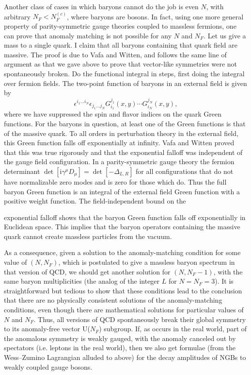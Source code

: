 Another class of cases in which baryons cannot do the job is even $N$, with
arbitrary $N_F<N_F^{(c)}$, where baryons are bosons. In fact, using one more
general property of parity-symmetric gauge theories coupled to massless
fermions, one can prove that anomaly matching is not possible for any $N$ and
$N_F$. Let us give a mass to a single quark. I claim that all baryons
containing that quark field are massive. The proof is due to Vafa and Witten,
and follows the same line of argument as that we gave above to prove that
vector-like symmetries were not spontaneously broken. Do the functional
integral in steps, first doing the integral over fermion fields. The two-point
function of baryons in an external field is given by
\[
  \epsilon^{i_1\ldots i_N}\epsilon_{j_1\ldots j_N}
  G^{j_1}_{i_1}(x,y)\cdots G^{j_N}_{i_N}(x,y),
\]
where we have suppressed the spin and flavor indices on the quark Green
functions. For the baryons in question, at least one of the Green functions is
that of the massive quark. To all orders in perturbation theory in the
external field, this Green function falls off exponentially at infinity. Vafa
and Witten \cite{banks-ref-99} proved that this was true rigorously and that the exponential
falloff was independent of the gauge field configuration. In a parity-symmetric
gauge theory the fermion determinant
$\det[\mathrm{i}\gamma^\mu D_\mu]=\det[-\Delta_{L,R}]$ for all
configurations that do not have normalizable zero modes and is zero for those
which do. Thus the full baryon Green function is an integral of the external
field Green function with a positive weight function. The field-independent
bound on the

exponential falloff shows that the baryon Green function falls off
exponentially in Euclidean space. This implies that the baryon operators
containing the massive quark cannot create massless particles from the
vacuum.

As a consequence, given a solution to the anomaly-matching condition for some
value of $(N,N_F)$, which is postulated to give a massless baryon spectrum in
that version of QCD, we should get another solution for $(N,N_F-1)$, with the
same baryon multiplicities (the analog of the integer $L$ for $N=N_F=3$). It
is straightforward but tedious to show that these conditions lead to the
conclusion that there are no physically consistent solutions of the
anomaly-matching conditions, even though there are mathematical solutions for
particular values of $N$ and $N_F$. Thus, all versions of QCD spontaneously
break their global symmetry to its anomaly-free vector U($N_F$) subgroup. If,
as occurs in the real world, part of the anomalous symmetry is weakly gauged,
with the anomaly canceled out by spectators (i.e. leptons in the real world),
then we also get formulae (from the Wess--Zumino Lagrangian alluded to above)
for the decay amplitudes of NGBs to weakly coupled gauge bosons.

